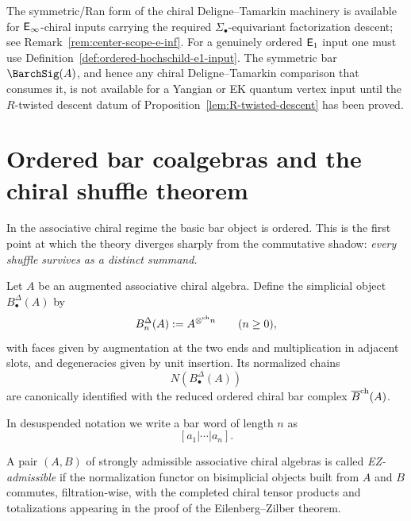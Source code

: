 \begin{warning}
\label{warn:deligne-tamarkin-ordered-firewall}
\ClaimStatusConditional{}
The symmetric/Ran form of the chiral Deligne--Tamarkin machinery is
available for $\mathsf{E}_{\infty}$-chiral inputs carrying the required
$\Sigma_\bullet$-equivariant factorization descent; see
Remark~\ref{rem:center-scope-e-inf}.  For a genuinely ordered
$\mathsf{E}_1$ input one must use
Definition~\ref{def:ordered-hochschild-e1-input}.  The symmetric bar
$\BarchSig(A)$, and hence any chiral Deligne--Tamarkin comparison
that consumes it, is not available for a Yangian or EK quantum vertex
input until the $R$-twisted descent datum of
Proposition~\ref{lem:R-twisted-descent} has been proved.
\end{warning}

\section{Ordered bar coalgebras and the chiral shuffle theorem}
\label{sec:shuffle}

In the associative chiral regime the basic bar object is ordered. This is the first point at which
the theory diverges sharply from the commutative shadow: \emph{every shuffle survives as a distinct
summand.}

\begin{definition}
Let $A$ be an augmented associative chiral algebra. Define the simplicial object
$B^\Delta_\bullet(A)$ by
\[
B^\Delta_n(A):=A^{\mathbin{\otimes^{\mathrm{ch}}} n}\qquad (n\geq 0),
\]
with faces given by augmentation at the two ends and multiplication in adjacent slots, and
degeneracies given by unit insertion. Its normalized chains
\[
N(B^\Delta_\bullet(A))
\]
are canonically identified with the reduced ordered chiral bar complex $\overline{B}^{\mathrm{ch}}(A)$.
\end{definition}

In desuspended notation we write a bar word of length $n$ as
\[
[a_1|\cdots|a_n].
\]

\begin{definition}
A pair $(A,B)$ of strongly admissible associative chiral algebras is called \emph{EZ-admissible} if
the normalization functor on bisimplicial objects built from $A$ and $B$ commutes, filtration-wise,
with the completed chiral tensor products and totalizations appearing in the proof of the
Eilenberg--Zilber theorem.
\end{definition}

